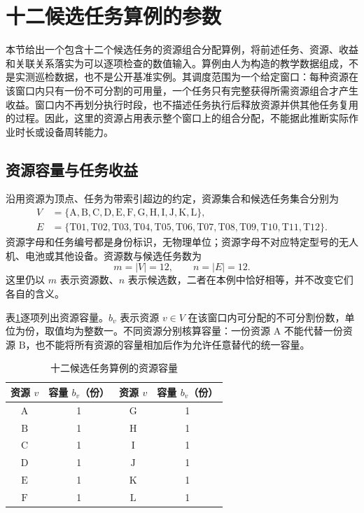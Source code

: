 \section{十二候选任务算例的参数}
\label{sec:02_05}

本节给出一个包含十二个候选任务的资源组合分配算例，将前述任务、资源、收益和关联关系落实为可以逐项检查的数值输入。算例由人为构造的教学数据组成，不是实测巡检数据，也不是公开基准实例。其调度范围为一个给定窗口：每种资源在该窗口内只有一份不可分割的可用量，一个任务只有完整获得所需资源组合才产生收益。窗口内不再划分执行时段，也不描述任务执行后释放资源并供其他任务复用的过程。因此，这里的资源占用表示整个窗口上的组合分配，不能据此推断实际作业时长或设备周转能力。

\subsection{资源容量与任务收益}

沿用资源为顶点、任务为带索引超边的约定，资源集合和候选任务集合分别为
\begin{align}
 V&=\{\mathrm{A},\mathrm{B},\mathrm{C},\mathrm{D},\mathrm{E},\mathrm{F},
 \mathrm{G},\mathrm{H},\mathrm{I},\mathrm{J},\mathrm{K},\mathrm{L}\},
 \label{s0205:resources}\\
 E&=\{\mathrm{T01},\mathrm{T02},\mathrm{T03},\mathrm{T04},
 \mathrm{T05},\mathrm{T06},\mathrm{T07},\mathrm{T08},
 \mathrm{T09},\mathrm{T10},\mathrm{T11},\mathrm{T12}\}.
 \label{s0205:tasks}
\end{align}
资源字母和任务编号都是身份标识，无物理单位；资源字母不对应特定型号的无人机、电池或其他设备。资源数与候选任务数为
\begin{equation}
 m=|V|=12,\qquad n=|E|=12.
 \label{s0205:dimensions}
\end{equation}
这里仍以 $m$ 表示资源数、$n$ 表示候选数，二者在本例中恰好相等，并不改变它们各自的含义。

表\ref{s0205:capacity_table}逐项列出资源容量。$b_v$ 表示资源 $v\in V$ 在该窗口内可分配的不可分割份数，单位为份，取值均为整数一。不同资源分别核算容量：一份资源 $\mathrm{A}$ 不能代替一份资源 $\mathrm{B}$，也不能将所有资源的容量相加后作为允许任意替代的统一容量。

\begin{table}[htbp]
 \centering
 \caption{十二候选任务算例的资源容量}
 \label{s0205:capacity_table}
 \begin{tabular}{cccc}
  \toprule
  资源 $v$ & 容量 $b_v$（份） & 资源 $v$ & 容量 $b_v$（份）\\
  \midrule
  $\mathrm{A}$ & 1 & $\mathrm{G}$ & 1\\
  $\mathrm{B}$ & 1 & $\mathrm{H}$ & 1\\
  $\mathrm{C}$ & 1 & $\mathrm{I}$ & 1\\
  $\mathrm{D}$ & 1 & $\mathrm{J}$ & 1\\
  $\mathrm{E}$ & 1 & $\mathrm{K}$ & 1\\
  $\mathrm{F}$ & 1 & $\mathrm{L}$ & 1\\
  \bottomrule
 \end{tabular}
\end{table}

